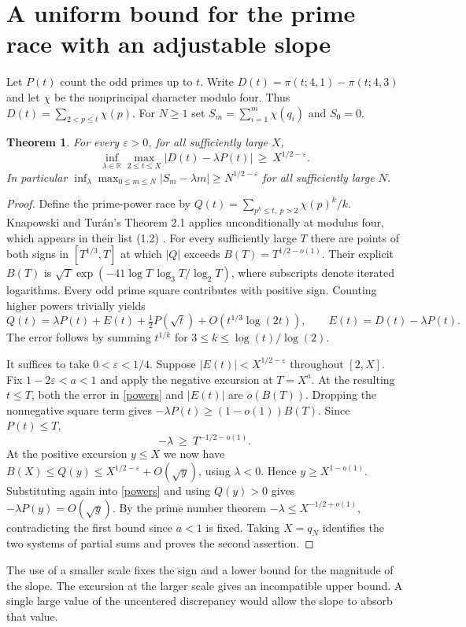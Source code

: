 \documentclass[11pt,a4paper]{article}
\newtheorem{theorem}{Theorem}
\newcommand{\eps}{\varepsilon}
\begin{document}
\section{A uniform bound for the prime race with an adjustable slope}
Let $P(t)$ count the odd primes up to $t$. Write $D(t)=\pi(t;4,1)-\pi(t;4,3)$ and let $\chi$ be the nonprincipal character modulo four. Thus $D(t)=\sum_{2<p\le t}\chi(p)$. For $N\ge1$ set $S_m=\sum_{i=1}^m\chi(q_i)$ and $S_0=0$.
\begin{theorem}\label{race}
For every $\eps>0$, for all sufficiently large $X$,
\[
 \inf_{\lambda\in\mathbb R}\max_{2\le t\le X}
         |D(t)-\lambda P(t)|\ \ge\ X^{1/2-\eps}.
\]
In particular $\inf_\lambda\max_{0\le m\le N}|S_m-\lambda m|\ge N^{1/2-\eps}$ for all sufficiently large $N$.
\end{theorem}
\begin{proof}
Define the prime-power race by $Q(t)=\sum_{p^k\le t,\ p>2}\chi(p)^k/k$. Knapowski and Tur\'an's Theorem 2.1 applies unconditionally at modulus four, which appears in their list (1.2) \cite{kt1,kt2}. For every sufficiently large $T$ there are points of both signs in $[T^{1/3},T]$ at which $|Q|$ exceeds $B(T)=T^{1/2-o(1)}$. Their explicit
$B(T)$ is $\sqrt T\exp(-41\log T\,\log_3T/\log_2T)$, where subscripts denote iterated logarithms. Every odd prime square contributes with positive sign. Counting higher powers trivially yields
\begin{equation}\label{powers}
 Q(t)=\lambda P(t)+E(t)+\tfrac12P(\sqrt t)+O(t^{1/3}\log(2t)),
 \qquad E(t)=D(t)-\lambda P(t).
\end{equation}
The error follows by summing $t^{1/k}$ for $3\le k\le \log(t)/\log(2)$.

It suffices to take $0<\eps<1/4$. Suppose $|E(t)|<X^{1/2-\eps}$ throughout $[2,X]$. Fix $1-2\eps<a<1$ and apply the negative excursion at $T=X^a$. At the resulting $t\le T$, both the error in \eqref{powers} and $|E(t)|$ are $o(B(T))$. Dropping the nonnegative square term gives $-\lambda P(t)\ge (1-o(1))B(T)$. Since $P(t)\le T$,
\[
                      -\lambda\ \ge\ T^{-1/2-o(1)}.
\]
At the positive excursion $y\le X$ we now have
$B(X)\le Q(y)\le X^{1/2-\eps}+O(\sqrt y)$, using $\lambda<0$.
Hence $y\ge X^{1-o(1)}$. Substituting again into \eqref{powers} and using $Q(y)>0$ gives $-\lambda P(y)=O(\sqrt y)$. By the prime number theorem $-\lambda\le X^{-1/2+o(1)}$, contradicting the first bound since $a<1$ is fixed. Taking $X=q_N$ identifies the two systems of partial sums and proves the second assertion.
\end{proof}
\noindent
The use of a smaller scale fixes the sign and a lower bound for the magnitude of the slope. The excursion at the larger scale gives an incompatible upper bound. A single large value of the uncentered discrepancy would allow the slope to absorb that value.
\newpage
\end{document}
